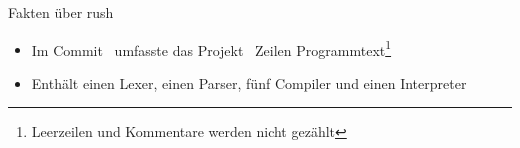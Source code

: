 \begin{frame}{Fakten über rush}
    \begin{itemize}
        \item Im Commit \rushCommit~umfasste das Projekt \rushLoc~Zeilen Programmtext\footnote{Leerzeilen und Kommentare werden nicht gezählt}
        \item Enthält einen Lexer, einen Parser, fünf Compiler und einen Interpreter
    \end{itemize}
\end{frame}
